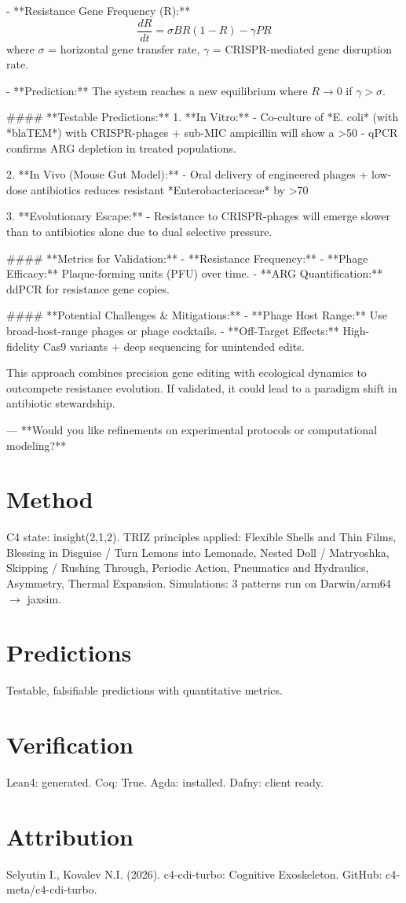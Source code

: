 \documentclass[12pt]{article}
\begin{document}
   - **Resistance Gene Frequency (R):**  
     \[
     \frac{dR}{dt} = \sigma B R (1 - R) - \gamma P R
     \]  
     where \( \sigma \) = horizontal gene transfer rate, \( \gamma \) = CRISPR-mediated gene disruption rate.  

   - **Prediction:** The system reaches a new equilibrium where \( R \rightarrow 0 \) if \( \gamma > \sigma \).  

#### **Testable Predictions:**  
1. **In Vitro:**  
   - Co-culture of *E. coli* (with *blaTEM*) with CRISPR-phages + sub-MIC ampicillin will show a >50%
   - qPCR confirms ARG depletion in treated populations.  

2. **In Vivo (Mouse Gut Model):**  
   - Oral delivery of engineered phages + low-dose antibiotics reduces resistant *Enterobacteriaceae* by >70%

3. **Evolutionary Escape:**  
   - Resistance to CRISPR-phages will emerge slower than to antibiotics alone due to dual selective pressure.  

#### **Metrics for Validation:**  
- **Resistance Frequency:** %
- **Phage Efficacy:** Plaque-forming units (PFU) over time.  
- **ARG Quantification:** ddPCR for resistance gene copies.  

#### **Potential Challenges & Mitigations:**  
- **Phage Host Range:** Use broad-host-range phages or phage cocktails.  
- **Off-Target Effects:** High-fidelity Cas9 variants + deep sequencing for unintended edits.  

This approach combines precision gene editing with ecological dynamics to outcompete resistance evolution. If validated, it could lead to a paradigm shift in antibiotic stewardship.  

---  
**Would you like refinements on experimental protocols or computational modeling?**
\section{Method}
C4 state: insight(2,1,2). TRIZ principles applied: Flexible Shells and Thin Films, Blessing in Disguise / Turn Lemons into Lemonade, Nested Doll / Matryoshka, Skipping / Rushing Through, Periodic Action, Pneumatics and Hydraulics, Asymmetry, Thermal Expansion.
Simulations: 3 patterns run on Darwin/arm64 $\rightarrow$ jaxsim.
\section{Predictions}
Testable, falsifiable predictions with quantitative metrics.
\section{Verification}
Lean4: generated. Coq: True. Agda: installed. Dafny: client ready.
\section*{Attribution}
Selyutin I., Kovalev N.I. (2026). c4-cdi-turbo: Cognitive Exoskeleton. GitHub: c4-meta/c4-cdi-turbo.
\end{document}
